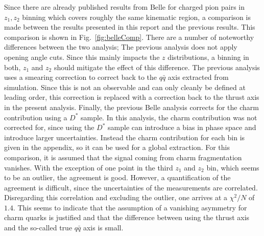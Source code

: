 \documentclass[aps,prX,preprint,groupedaddress,linenumbers]{revtex4-1}
\begin{document}
Since there are already published results from Belle for charged pion pairs in $z_1,z_2$ binning which covers roughly the same kinematic region, a comparison is made between the results presented in this report and the previous results. This comparison is shown in Fig.~\ref{fig:belleComp}. There are a number of noteworthy differences between the two analysis; The previous analysis does not apply opening angle cuts. Since this mainly impacts the $z$ distributions, a binning in both, $z_1$ and $z_2$ should mitigate the effect of this difference. The previous analysis uses a smearing correction to correct back to the $q\bar{q}$ axis extracted from simulation. Since this is not an observable and can only cleanly be defined at leading order, this correction is replaced with a correction back to the thrust axis in the present analysis. 
Finally, the previous Belle analysis corrects for the charm contribution using a $D^*$ sample. In this analysis, the charm contribution was not corrected for, since using the $D^*$ sample can introduce a bias in phase space and introduce larger uncertainties. Instead the charm contribution for each bin is given in the appendix, so it can be used for a global extraction. For this comparison, it is assumed that the signal coming from charm fragmentation vanishes. 
With the exception of one point in the third $z_1$ and $z_2$ bin, which seems to be an outlier, the agreement is good. However, a quantification of the agreement is difficult, since the uncertainties of the measurements are correlated. Disregarding this correlation and excluding the outlier, one arrives at a $\chi^2/N$ of $1.4$.
This seems to indicate that the assumption of a vanishing asymmetry for charm quarks is justified and that the difference between using the thrust axis and the so-called true $q\bar{q}$ axis is small.
\end{document}
